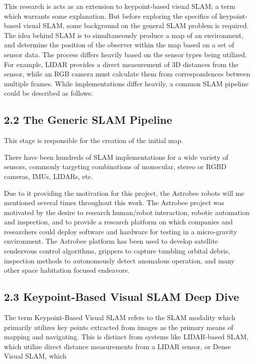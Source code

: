 \documentclass[12pt]{article}
\begin{document}
This research is acts as an extension to keypoint-based visual SLAM; a term which warrants some explanation. But before exploring the specifics of keypoint-based visual SLAM, some background on the general SLAM problem is required. The idea behind SLAM is to simultaneously produce a map of an environment, and determine the position of the observer within the map based on a set of sensor data. The process differs heavily based on the sensor types being utilized. For example, LIDAR provides a direct measurement of 3D distances from the sensor, while an RGB camera must calculate them from correspondences between multiple frames. While implementations differ heavily, a common SLAM pipeline could be described as follows:

\subsection{2.2 The Generic SLAM Pipeline}

This stage is responsible for the creation of the initial map.

There have been hundreds of SLAM implementations for a wide variety of sensors, commonly targeting combinations of monocular, stereo or RGBD cameras, IMUs, LIDARs, etc.

Due to it providing the motivation for this project, the Astrobee robots will me mentioned several times throughout this work. The Astrobee project was motivated by the desire to research human/robot interaction, robotic automation and inspection, and to provide a research platform on which companies and researchers could deploy software and hardware for testing in a micro-gravity environment. The Astrobee platform has been used to develop satellite rendezvous control algorithms, grippers to capture tumbling orbital debris, inspection methods to autonomously detect anomalous operation, and many other space habitation focused endeavors.

\subsection{2.3 Keypoint-Based Visual SLAM Deep Dive}

The term Keypoint-Based Visual SLAM refers to the SLAM modality which primarily utilizes key points extracted from images as the primary means of mapping and navigating. This is distinct from systems like LIDAR-based SLAM, which utilize direct distance measurements from a LIDAR sensor, or Dense Visual SLAM, which 
\end{document}
